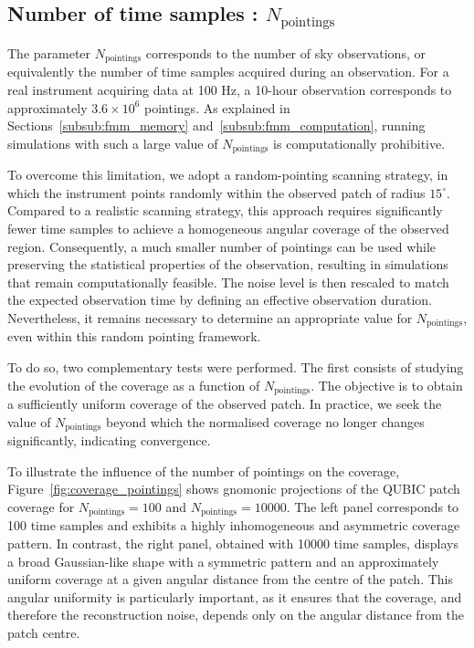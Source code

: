 \documentclass[../../thesis.tex]{subfiles}
\begin{document}
\subsection{Number of time samples : $N_\text{pointings}$}

The parameter $N_{\text{pointings}}$ corresponds to the number of sky observations, or equivalently the number of time samples acquired during an observation. For a real instrument acquiring data at 100 Hz, a 10-hour observation corresponds to approximately $3.6\times10^6$ pointings. As explained in Sections~\ref{subsub:fmm_memory} and~\ref{subsub:fmm_computation}, running simulations with such a large value of $N_{\text{pointings}}$ is computationally prohibitive.

To overcome this limitation, we adopt a random-pointing scanning strategy, in which the instrument points randomly within the observed patch of radius $15^\circ$. Compared to a realistic scanning strategy, this approach requires significantly fewer time samples to achieve a homogeneous angular coverage of the observed region. Consequently, a much smaller number of pointings can be used while preserving the statistical properties of the observation, resulting in simulations that remain computationally feasible. The noise level is then rescaled to match the expected observation time by defining an effective observation duration. Nevertheless, it remains necessary to determine an appropriate value for $N_{\text{pointings}}$, even within this random pointing framework.

To do so, two complementary tests were performed. The first consists of studying the evolution of the coverage as a function of $N_{\text{pointings}}$. The objective is to obtain a sufficiently uniform coverage of the observed patch. In practice, we seek the value of $N_{\text{pointings}}$ beyond which the normalised coverage no longer changes significantly, indicating convergence.

To illustrate the influence of the number of pointings on the coverage, Figure~\ref{fig:coverage_pointings} shows gnomonic projections of the QUBIC patch coverage for $N_{\text{pointings}}=100$ and $N_{\text{pointings}}=10000$. The left panel corresponds to 100 time samples and exhibits a highly inhomogeneous and asymmetric coverage pattern. In contrast, the right panel, obtained with 10000 time samples, displays a broad Gaussian-like shape with a symmetric pattern and an approximately uniform coverage at a given angular distance from the centre of the patch. This angular uniformity is particularly important, as it ensures that the coverage, and therefore the reconstruction noise, depends only on the angular distance from the patch centre.
\end{document}
